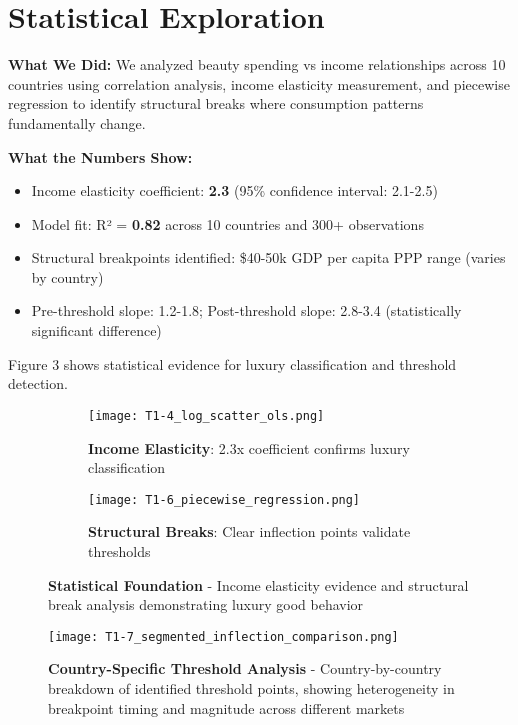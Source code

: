 \documentclass[11pt]{article}
\begin{document}
\section{Statistical Exploration}

\textbf{What We Did:} We analyzed beauty spending vs income relationships across 10 countries using correlation analysis, income elasticity measurement, and piecewise regression to identify structural breaks where consumption patterns fundamentally change.

\textbf{What the Numbers Show:}
\vspace{-5pt}
\begin{itemize}
    \setlength{\itemsep}{-2pt}
    \item Income elasticity coefficient: \textbf{2.3} (95\% confidence interval: 2.1-2.5)
    \item Model fit: R² = \textbf{0.82} across 10 countries and 300+ observations
    \item Structural breakpoints identified: \$40-50k GDP per capita PPP range (varies by country)
    \item Pre-threshold slope: 1.2-1.8; Post-threshold slope: 2.8-3.4 (statistically significant difference)
\end{itemize}

Figure 3 shows statistical evidence for luxury classification and threshold detection.

\begin{figure}[H]
\centering
\begin{subfigure}[b]{0.48\textwidth}
    \texttt{[image: T1-4\_log\_scatter\_ols.png]}
    \caption{\textbf{Income Elasticity}: 2.3x coefficient confirms luxury classification}
\end{subfigure}
\hfill
\begin{subfigure}[b]{0.48\textwidth}
    \texttt{[image: T1-6\_piecewise\_regression.png]}
    \caption{\textbf{Structural Breaks}: Clear inflection points validate thresholds}
\end{subfigure}
\caption{\textbf{Statistical Foundation} - Income elasticity evidence and structural break analysis demonstrating luxury good behavior}
\end{figure}

\begin{figure}[H]
\centering
\texttt{[image: T1-7\_segmented\_inflection\_comparison.png]}
\caption{\textbf{Country-Specific Threshold Analysis} - Country-by-country breakdown of identified threshold points, showing heterogeneity in breakpoint timing and magnitude across different markets}
\end{figure}
\end{document}
